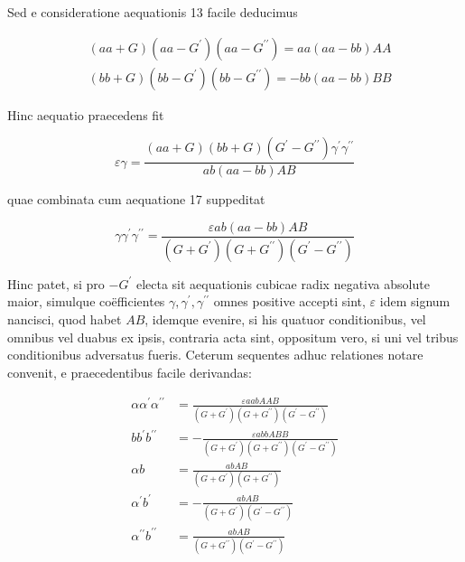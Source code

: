 \documentclass[10pt]{article}
\begin{document}
Sed e consideratione aequationis 13 facile deducimus

\[
\begin{aligned}
& (a a+G)\left(a a-G^{\prime}\right)\left(a a-G^{\prime \prime}\right)=a a(a a-b b) A A \\
& (b b+G)\left(b b-G^{\prime}\right)\left(b b-G^{\prime \prime}\right)=-b b(a a-b b) B B
\end{aligned}
\]

Hinc aequatio praecedens fit

\[
\varepsilon \gamma=\frac{(a a+G)(b b+G)\left(G^{\prime}-G^{\prime \prime}\right) \gamma^{\prime} \gamma^{\prime \prime}}{a b(a a-b b) A B}
\]

quae combinata cum aequatione 17 suppeditat

\[
\gamma \gamma^{\prime} \gamma^{\prime \prime}=\frac{\varepsilon a b(a a-b b) A B}{\left(G+G^{\prime}\right)\left(G+G^{\prime \prime}\right)\left(G^{\prime}-G^{\prime \prime}\right)}
\]

Hinc patet, si pro \(-G^{\prime}\) electa sit aequationis cubicae radix negativa absolute maior, simulque coëfficientes \(\gamma, \gamma^{\prime}, \gamma^{\prime \prime}\) omnes positive accepti sint, \(\varepsilon\) idem signum nancisci, quod habet \(A B\), idemque evenire, si his quatuor conditionibus, vel omnibus vel duabus ex ipsis, contraria acta sint, oppositum vero, si uni vel tribus conditionibus adversatus fueris. Ceterum sequentes adhuc relationes notare convenit, e praecedentibus facile derivandas:

\[
\begin{aligned}
\alpha \alpha^{\prime} \alpha^{\prime \prime} & =\frac{\varepsilon a a b A A B}{\left(G+G^{\prime}\right)\left(G+G^{\prime \prime}\right)\left(G^{\prime}-G^{\prime \prime}\right)} \\
b b^{\prime} b^{\prime \prime} & =-\frac{\varepsilon a b b A B B}{\left(G+G^{\prime}\right)\left(G+G^{\prime \prime}\right)\left(G^{\prime}-G^{\prime \prime}\right)} \\
\alpha b & =\frac{a b A B}{\left(G+G^{\prime}\right)\left(G+G^{\prime \prime}\right)} \\
\alpha^{\prime} b^{\prime} & =-\frac{a b A B}{\left(G+G^{\prime}\right)\left(G^{\prime}-G^{\prime \prime}\right)} \\
\alpha^{\prime \prime} b^{\prime \prime} & =\frac{a b A B}{\left(G+G^{\prime \prime}\right)\left(G^{\prime}-G^{\prime \prime}\right)}
\end{aligned}
\]
\end{document}
